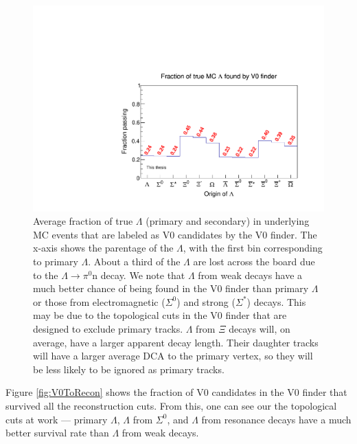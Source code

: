\begin{figure}[hbtp]
\includegraphics[width=36pc]{Figures/YieldAndEff/2016-08-10-FractionBeginToV0Finder.pdf}
\caption[V0 finder efficiency]{
Average fraction of true $\Lambda$ (primary and secondary) in underlying MC events that are labeled as V0 candidates by the V0 finder.
The x-axis shows the parentage of the $\Lambda$, with the first bin corresponding to primary $\Lambda$.
About a third of the $\Lambda$ are lost across the board due to the $\Lambda \rightarrow \pi^0 \mathrm{n}$ decay.
We note that $\Lambda$ from weak decays have a much better chance of being found in the V0 finder than primary $\Lambda$ or those from electromagnetic ($\Sigma^0$) and strong ($\Sigma^*$) decays.
This may be due to the topological cuts in the V0 finder that are designed to exclude primary tracks.
$\Lambda$ from $\Xi$ decays will, on average, have a larger apparent decay length.
Their daughter tracks will have a larger average DCA to the primary vertex, so they will be less likely to be ignored as primary tracks.
}
\label{fig:BeginToV0}
\end{figure}


Figure \ref{fig:V0ToRecon} shows the fraction of V0 candidates in the V0 finder that survived all the reconstruction cuts.  
From this, one can see our the topological cuts at work --- primary $\Lambda$, $\Lambda$ from $\Sigma^0$, and $\Lambda$ from resonance decays have a much better survival rate than $\Lambda$ from weak decays.


